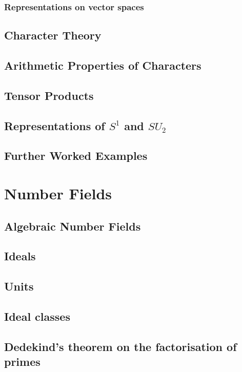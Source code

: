 \documentclass[12pt]{book}
\theoremstyle{definition}
\theoremstyle{remark}
\begin{document}
			\subsection{Representations on vector spaces}
		
		\section{Character Theory}
		
		\section{Arithmetic Properties of Characters}
		
		\section{Tensor Products}
		
		\section{Representations of $S^1$ and $SU_2$}
		
		\section{Further Worked Examples}
		
	\chapter{Number Fields}
		\section{Algebraic Number Fields}
		
		\section{Ideals}
		
		\section{Units}
		
		\section{Ideal classes}
		
		\section{Dedekind’s theorem on the factorisation of primes}
\end{document}
